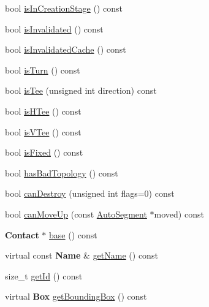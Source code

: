 \begin{DoxyCompactItemize}
\item 
bool \mbox{\hyperlink{classKatabatic_1_1AutoContact_a77e5036ce0c3628f5bf65e729ba875ba}{is\+In\+Creation\+Stage}} () const
\item 
bool \mbox{\hyperlink{classKatabatic_1_1AutoContact_ac540608485240ff88970131ebc02c1ab}{is\+Invalidated}} () const
\item 
bool \mbox{\hyperlink{classKatabatic_1_1AutoContact_a6d1120fc8800af5d269e72ce5c3ba629}{is\+Invalidated\+Cache}} () const
\item 
bool \mbox{\hyperlink{classKatabatic_1_1AutoContact_a249530ac086dbf92f981887cc633facf}{is\+Turn}} () const
\item 
bool \mbox{\hyperlink{classKatabatic_1_1AutoContact_ae4ba7bc2888f990818cbdb808260c47e}{is\+Tee}} (unsigned int direction) const
\item 
bool \mbox{\hyperlink{classKatabatic_1_1AutoContact_aeb66931d535cbd3d0f9bc525968e15f5}{is\+H\+Tee}} () const
\item 
bool \mbox{\hyperlink{classKatabatic_1_1AutoContact_ae38846b6213cccbc6f008b175b4604b0}{is\+V\+Tee}} () const
\item 
bool \mbox{\hyperlink{classKatabatic_1_1AutoContact_afd7362b850709bed8b61c1aa22399f97}{is\+Fixed}} () const
\item 
bool \mbox{\hyperlink{classKatabatic_1_1AutoContact_acc77b6de9050a86dc41e25888c8f81f6}{has\+Bad\+Topology}} () const
\item 
bool \mbox{\hyperlink{classKatabatic_1_1AutoContact_af783b79a1398450e28e2ea55c3eb8476}{can\+Destroy}} (unsigned int flags=0) const
\item 
bool \mbox{\hyperlink{classKatabatic_1_1AutoContact_a69d29e4d230a0111ca18e6e661a48f8b}{can\+Move\+Up}} (const \mbox{\hyperlink{classKatabatic_1_1AutoSegment}{Auto\+Segment}} $\ast$moved) const
\item 
\textbf{ Contact} $\ast$ \mbox{\hyperlink{classKatabatic_1_1AutoContact_ab422116c7edfacedd31711c96e3ec95b}{base}} () const
\item 
virtual const \textbf{ Name} \& \mbox{\hyperlink{classKatabatic_1_1AutoContact_a9e76ae5cee9320b65251387419c9432b}{get\+Name}} () const
\item 
size\+\_\+t \mbox{\hyperlink{classKatabatic_1_1AutoContact_a1e57c42301b9e58648863e7d5dc055e7}{get\+Id}} () const
\item 
virtual \textbf{ Box} \mbox{\hyperlink{classKatabatic_1_1AutoContact_ab5d8bf98ab5af6fcfebea1b9f446d5d7}{get\+Bounding\+Box}} () const
\item 

\end{DoxyCompactItemize}
